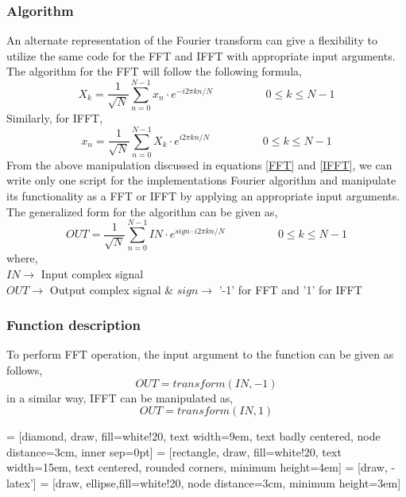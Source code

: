 \subsubsection{Algorithm}
An alternate representation of the Fourier transform can give a flexibility to utilize the same code for the FFT and IFFT with appropriate input arguments. The algorithm for the FFT will follow the following formula,
\begin{equation}
X_k =\frac{1}{\sqrt{N}} \sum\limits_{n=0}^{N-1} x_n \cdot e^{-i2\pi kn/N}		\hspace{2cm}	0\leq k \leq N-1 
\label{FFT}
\end{equation}
Similarly, for IFFT,
\begin{equation}
x_n =\frac{1}{\sqrt{N}} \sum\limits_{n=0}^{N-1} X_k \cdot e^{i2\pi kn/N}		\hspace{2cm}	0\leq k \leq N-1 
\label{IFFT}
\end{equation}
From the above manipulation discussed in equations \ref{FFT} and \ref{IFFT}, we can write only one script for the implementations Fourier algorithm and manipulate its functionality as a FFT or IFFT by applying an appropriate input arguments. \\
The generalized form for the algorithm can be given as,
\begin{equation}
OUT =\frac{1}{\sqrt{N}} \sum\limits_{n=0}^{N-1} IN \cdot e^{sign \cdot i2\pi kn/N}		\hspace{2cm}	0\leq k \leq N-1 
\label{FT}
\end{equation}
where,\\
$IN \rightarrow$ {Input complex signal}\\
$OUT \rightarrow$ {Output complex signal} \& $sign \rightarrow$ {'-1' for FFT and '1' for IFFT}\\

\subsubsection{Function description}
To perform FFT operation, the input argument to the function can be given as follows,
\begin{equation*}
OUT = transform(IN,-1)
\end{equation*}
in a similar way, IFFT can be manipulated as,
\begin{equation*}
OUT = transform(IN,1)
\end{equation*}

\newpage
 = [diamond, draw, fill=white!20, 
text width=9em, text badly centered, node distance=3cm, inner sep=0pt]
 = [rectangle, draw, fill=white!20, 
text width=15em, text centered, rounded corners, minimum height=4em]
 = [draw, -latex']
 = [draw, ellipse,fill=white!20, node distance=3cm,
minimum height=3em]

